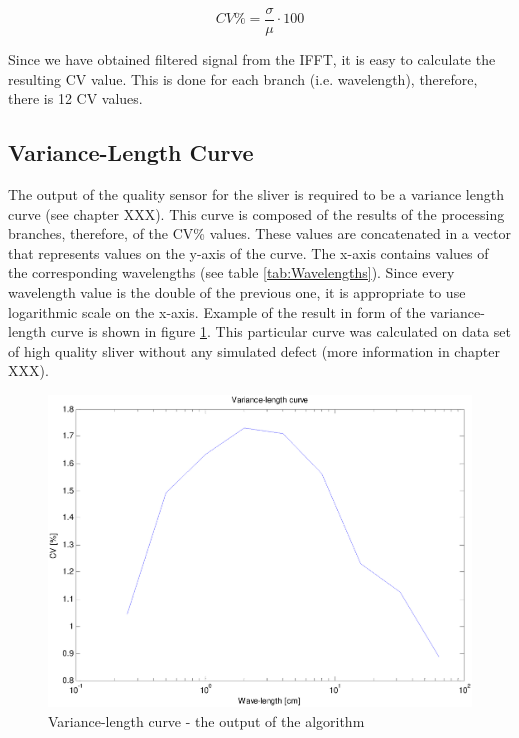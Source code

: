 \documentclass[twoside]{ctuthesis}
\theoremstyle{plain}
\theoremstyle{definition}
\theoremstyle{note}
\begin{document}
\begin{equation} \label{eq:CVCalculation}
CV\% = \frac{\sigma}{\mu} \cdot 100
\end{equation}

Since we have obtained filtered signal from the IFFT, it is easy to calculate the resulting CV value. This is done for each branch (i.e. wavelength), therefore, there is 12 CV values.

\subsection{Variance-Length Curve}
The output of the quality sensor for the sliver is required to be a variance length curve (see chapter XXX). This curve is composed of the results of the processing branches, therefore, of the CV\% values. These values are concatenated in a vector that represents values on the y-axis of the curve. The x-axis contains values of the corresponding wavelengths (see table \ref{tab:Wavelengths}). Since every wavelength value is the double of the previous one, it is appropriate to use logarithmic scale on the x-axis. Example of the result in form of the variance-length curve is shown in figure \ref{fig:VLC_example11}. This particular curve was calculated on data set of high quality sliver without any simulated defect (more information in chapter XXX). 

\begin{figure}[h]
	\centering
	\includegraphics[width=1.0\textwidth]{full_VLC_11.eps}
	\caption{Variance-length curve - the output of the algorithm}
	\label{fig:VLC_example11}
\end{figure}
\end{document}
